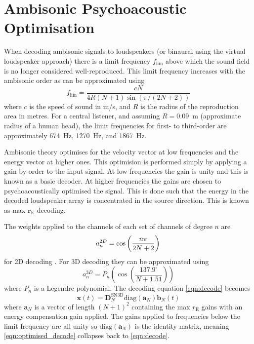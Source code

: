 \documentclass[12pt]{report}
\begin{document}
\section{Ambisonic Psychoacoustic Optimisation}\label{AmbiShelves}

When decoding ambisonic signals to loudspeakers (or binaural using the virtual loudspeaker approach) there is a limit frequency $f_{\mathrm{lim}}$ above which the sound field is no longer considered well-reproduced.
This limit frequency increases with the ambisonic order as can be approximated using \cite{Bertet2013}
\begin{equation}
    f_{\mathrm{lim}} = \frac{c N}{4 R (N + 1) \sin(\pi/(2N + 2))}
\end{equation}
where $c$ is the speed of sound in m/s, and $R$ is the radius of the reproduction area in metres.
For a central listener, and assuming $R = 0.09$~m (approximate radius of a human head), the limit frequencies for first- to third-order are approximately 674~Hz, 1270~Hz, and 1867~Hz.

Ambisonic theory optimises for the velocity vector at low frequencies and the energy vector at higher ones.
This optimision is performed simply by applying a gain by-order to the input signal.
At low frequencies the gain is unity and this is known as a basic decoder.
At higher frequencies the gains are chosen to psychoacoustically optimised the signal.
This is done such that the energy in the decoded loudspeaker array is concentrated in the source direction.
This is known as max $\textbf{r}_{\textrm{E}}$ decoding.

The weights applied to the channels of each set of channels of degree $n$ are
\begin{equation}
a_{n}^{2D} = \cos\left( \frac{n\pi}{2N + 2} \right)\\
\end{equation}
for 2D decoding \cite{Daniel2000}.
For 3D decoding they can be approximated using \cite{Zotter2012a}
\begin{equation}
    a_{n}^{3D} = P_{n}\left(\cos \left(\frac{137.9^{\circ}}{N + 1.51}\right) \right)
\end{equation}
where $P_{n}$ is a Legendre polynomial.
The decoding equation \cref{eqn:decode} becomes
\begin{equation}\label{eqn:optimised_decode}
\textbf{x}(t) = \textbf{D}_{N}^{\mathrm{SN3D}} \mathrm{diag}(\textbf{a}_N)\textbf{b}_{N}(t)
\end{equation}
where $\textbf{a}_N$ is a vector of length $(N + 1)^{2}$ containing the max $r_{\mathrm{E}}$ gains with an energy compensation gain applied.
The gains applied to frequencies below the limit frequency are all unity so $\mathrm{diag}(\textbf{a}_N)$ is the identity matrix, meaning \cref{eqn:optimised_decode} collapses back to \cref{eqn:decode}.
\end{document}
